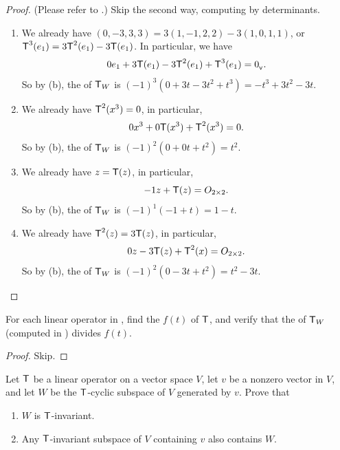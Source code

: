 \begin{proof}
(Please refer to .)
Skip the second way, computing by determinants.
\begin{enumerate}
\item We already have \((0, -3, 3, 3) = 3(1, -1, 2, 2) - 3(1, 0, 1, 1)\), or \(\textsf{T}^3(e_1) = 3\textsf{T}^2(e_1) - 3\textsf{T}(e_1)\).
In particular, we have
\[
    0 e_1 + 3\textsf{T}(e_1) - 3\textsf{T}^2(e_1) + \textsf{T}^3(e_1) = 0_{_{\textsf{V}}}.
\]
So by (b), the \CPOLY{} of \(\textsf{T}_W\) is \((-1)^3(0 + 3t - 3t^2 + t^3) = -t^3 + 3t^2 - 3t\).

\item We already have \(\textsf{T}^2(x^3) = 0\), in particular,
\[
    0 x^3 + 0 \textsf{T}(x^3) + \textsf{T}^2(x^3) = 0.
\]
So by (b), the \CPOLY{} of \(\textsf{T}_W\) is \((-1)^2(0 + 0t + t^2) = t^2\).

\item We already have \(z = \textsf{T}(z)\), in particular,
\[
    -1 z + \textsf{T}(z) = O_{2 \times 2}.
\]
So by (b), the \CPOLY{} of \(\textsf{T}_W\) is \((-1)^1(-1 + t) = 1 - t\).

\item We already have \(\textsf{T}^2(z) = 3\textsf{T}(z)\), in particular,
\[
    0 z - 3\textsf{T}(z) + \textsf{T}^2(x) = O_{2 \times 2}.
\]
So by (b), the \CPOLY{} of \(\textsf{T}_W\) is \((-1)^2(0 - 3t + t^2) = t^2 - 3t\).
\end{enumerate}
\end{proof}

\begin{exercise} \label{exercise 5.4.10}
For each linear operator in , find the \CPOLY{} \(f(t)\) of \(\textsf{T}\), and verify that the \CPOLY{} of \(\textsf{T}_W\) (computed in ) divides \(f(t)\).
\end{exercise}

\begin{proof}
Skip.
\end{proof}

\begin{exercise} \label{exercise 5.4.11}
Let \(\textsf{T}\) be a linear operator on a vector space \(V\), let \(v\) be a nonzero vector in \(V\), and let \(W\) be the \(\textsf{T}\)-cyclic subspace of \(V\) generated by \(v\).
Prove that
\begin{enumerate}
\item \(W\) is \(\textsf{T}\)-invariant.
\item Any \(\textsf{T}\)-invariant subspace of \(V\) containing \(v\) also contains \(W\).
\end{enumerate}
\end{exercise}

